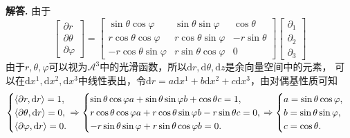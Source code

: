 \documentclass[12pt, a4paper, oneside]{ctexart}
\newenvironment{solution}[1][]{\par\noindent\textbf{#1解答. }}{\smallskip\par}  %
\def\d{\mathrm{d}}          %
\def\sA{\mathscr{A}}        %
\begin{document}
\begin{solution}
    由于
    \begin{equation*}
        \begin{bmatrix}
            \partial r\\
            \partial \theta\\
            \partial \varphi
        \end{bmatrix} = \begin{bmatrix}
            \sin\theta\cos\varphi&\sin\theta\sin\varphi&\cos\theta\\
            r\cos\theta\cos\varphi&r\cos\theta\sin\varphi&-r\sin\theta\\
            -r\cos\theta\sin\varphi&r\sin\theta\cos\varphi&0
        \end{bmatrix}\begin{bmatrix}
            \partial_1\\
            \partial_2\\
            \partial_3
        \end{bmatrix}
    \end{equation*}
    由于$r,\theta,\varphi$可以视为$\sA^3$中的光滑函数，所以$\d r,\d \theta,\d z$是余向量空间中的元素，
    可以在$\d x^1,\d x^2,\d x^3$中线性表出，令$\d r = a\d x^1+b\d x^2+c\d x^3$，由对偶基性质可知
    \begin{equation*}
        \begin{cases}
            \langle\partial r,\d r\rangle = 1,\\
            \langle\partial \theta,\d r\rangle = 0,\\
            \langle\partial \varphi,\d r\rangle = 0.
        \end{cases}
        \hspace{-0.35cm}\Rightarrow\begin{cases}
            \sin\theta\cos\varphi a+\sin\theta\sin\varphi b + \cos\theta c = 1,\\
            r\cos\theta\cos\varphi a+r\cos\theta\sin\varphi b - r\sin\theta c = 0,\\
            -r\sin\theta\sin\varphi + r\sin\theta\cos\varphi b = 0.
        \end{cases}\hspace{-0.35cm}\Rightarrow\begin{cases}
            a = \sin\theta\cos\varphi,\\
            b = \sin\theta\sin\varphi,\\
            c = \cos\theta.
        \end{cases}

\end{equation*}
\end{solution}
\end{document}
